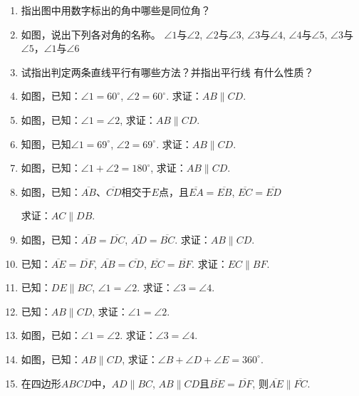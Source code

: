\begin{ex}
\begin{enumerate}
    \item 指出图中用数字标出的角中哪些是同位角？
    \item 如图，说出下列各对角的名称。
    $\angle 1$与$\angle 2$, $\angle 2$与$\angle 3$, $\angle 3$与$\angle 4$, $\angle 4$与$\angle 5$, $\angle 3$与
    $\angle 5$，$\angle 1$与$\angle 6$
    \item 试指出判定两条直线平行有哪些方法？并指出平行线
    有什么性质？
    \item 如图，已知：$\angle 1=60^{\circ}$, $\angle 2=60^{\circ}$. 
    求证：$AB\parallel CD$.

    \item 如图，已知：$\angle 1=\angle 2$, 求证：$AB\parallel CD$.
    \item 知图，已知$\angle 1=69^{\circ}$, $\angle 2=69^{\circ}$.
    求证：$AB\parallel CD$.
    \item 如图，已知：$\angle 1+\angle 2=180^{\circ}$, 求证：$AB\parallel CD$.
    \item 如图，已知：$\overline{AB}$、$\overline{CD}$相交于$E$点，且$\overline{EA}=\overline{EB}$, $\overline{EC}=\overline{ED}$
    
求证：$AC\parallel DB$.

\item 如图，已知：$\overline{AB}=\overline{DC}$, $\overline{AD}=\overline{BC}$. 求证：$AB\parallel CD$.
\item 已知：$\overline{AE}=\overline{DF}$, $\overline{AB}=\overline{CD}$, $\overline{EC}=\overline{BF}$. 
求证：$EC\parallel BF$.
\item 已知：$DE\parallel BC$, $\angle 1=\angle 2$. 求证：$\angle 3=\angle 4$.
\item 已知：$AB\parallel CD$, 求证：$\angle 1=\angle 2$.
\item 如图，已如：$\angle 1=\angle 2$. 求证：$\angle 3=\angle 4$.
\item 如图，已知：$AB\parallel CD$, 
求证：$\angle B+\angle D+\angle E=360^{\circ}$.

\item 在四边形$ABCD$中，$AD\parallel BC$, $AB\parallel CD$且$\overline{BE}=\overline{DF}$, 则$\overline{AE}\parallel \overline{FC}$.
\end{enumerate}
\end{ex}

